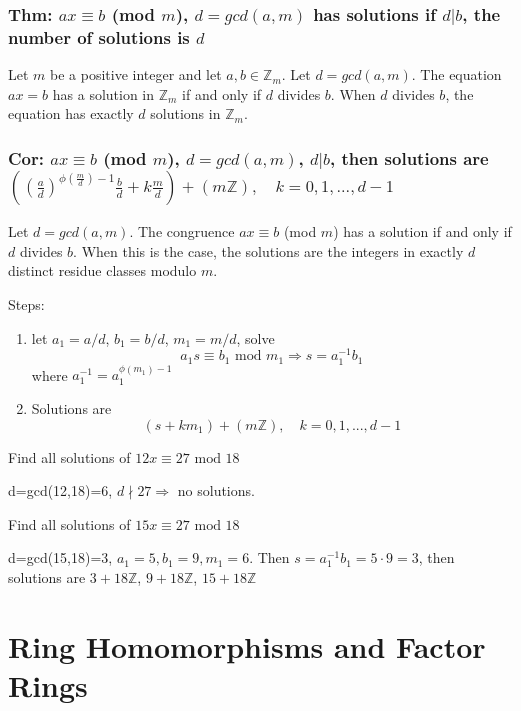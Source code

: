 \documentclass[11pt]{elegantbook}
\begin{document}
\subsection{Thm: $ax \equiv b$ (mod $m$), $d=gcd(a,m)$ has solutions if $d|b$, the number of solutions is $d$}
\begin{theorem}
    Let $m$ be a positive integer and let $a, b \in \mathbb{Z}_m$. Let $d=gcd(a,m)$. The equation $ax = b$ has a solution in $\mathbb{Z}_m$ if and only if $d$ divides $b$. When $d$ divides $b$, the equation has exactly $d$ solutions in $\mathbb{Z}_m$.
\end{theorem}

\subsection{Cor: $ax \equiv b$ (mod $m$), $d=gcd(a,m)$, $d|b$, then solutions are $((\frac{a}{d})^{\phi(\frac{m}{d})-1}\frac{b}{d}+k\frac{m}{d})+(m \mathbb{Z}),\quad k=0,1,...,d-1$}
\begin{corollary}
    Let $d=gcd(a,m)$. The congruence $ax \equiv b$ (mod $m$) has a
    solution if and only if $d$ divides $b$. When this is the case, the solutions are the integers in
    exactly $d$ distinct residue classes modulo $m$.
\end{corollary}
Steps:
\begin{enumerate}[(1)]
    \item let $a_1=a/d$, $b_1=b/d$, $m_1=m/d$, solve $$a_1s\equiv b_1 \text{ mod } m_1 \Rightarrow	s=a_1^{-1}b_1$$
    where $a_1^{-1}=a_1^{\phi(m_1)-1}$
    \item Solutions are $$(s+km_1)+(m \mathbb{Z}),\quad k=0,1,...,d-1$$
\end{enumerate}
\begin{example}
Find all solutions of $12 x\equiv 27 \text{ mod }18$
\end{example}
d=gcd(12,18)=6, $d\nmid 27 \Rightarrow$ no solutions.

\begin{example}
    Find all solutions of $15 x\equiv 27 \text{ mod }18$
\end{example}
d=gcd(15,18)=3, $a_1=5,b_1=9,m_1=6$. Then $s=a_1^{-1}b_1=5\cdot 9=3$, then solutions are $3+18 \mathbb{Z}$, $9+18 \mathbb{Z}$, $15+18 \mathbb{Z}$



\chapter{Ring Homomorphisms and Factor Rings}
\end{document}
